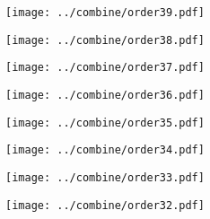 \documentclass{article}
\begin{document}
\begin{figure}[H]
    \centering
    \texttt{[image: ../combine/order39.pdf]}
\end{figure}
\begin{figure}[H]
    \centering
    \texttt{[image: ../combine/order38.pdf]}
\end{figure}
\begin{figure}[H]
    \centering
    \texttt{[image: ../combine/order37.pdf]}
\end{figure}
\begin{figure}[H]
    \centering
    \texttt{[image: ../combine/order36.pdf]}
\end{figure}
\begin{figure}[H]
    \centering
    \texttt{[image: ../combine/order35.pdf]}
\end{figure}
\begin{figure}[H]
    \centering
    \texttt{[image: ../combine/order34.pdf]}
\end{figure}
\begin{figure}[H]
    \centering
    \texttt{[image: ../combine/order33.pdf]}
\end{figure}
\begin{figure}[H]
    \centering
    \texttt{[image: ../combine/order32.pdf]}
\end{figure}

\end{document}
